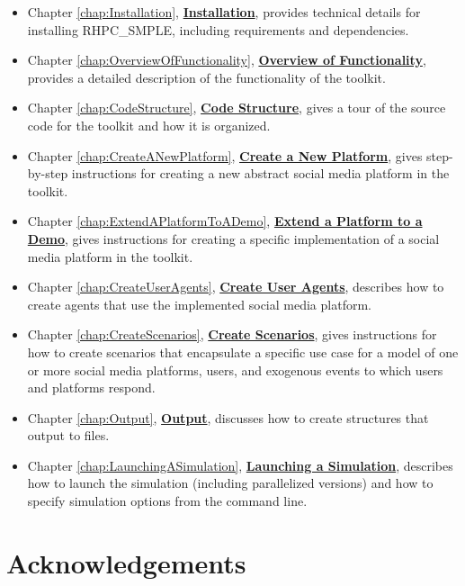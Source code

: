 \begin{itemize}
\item Chapter \ref*{chap:Installation}, \hyperref[chap:Installation]{\textbf{Installation}}, provides technical details for installing RHPC\_SMPLE, including requirements and dependencies.
\item Chapter \ref*{chap:OverviewOfFunctionality}, \hyperref[chap:OverviewOfFunctionality]{\textbf{Overview of Functionality}}, provides a detailed description of the functionality of the \rhpc toolkit.
\item Chapter \ref*{chap:CodeStructure}, \hyperref[chap:CodeStructure]{\textbf{Code Structure}}, gives a tour of the source code for the toolkit and how it is organized.
\item Chapter \ref*{chap:CreateANewPlatform}, \hyperref[chap:CreateANewPlatform]{\textbf{Create a New Platform}}, gives step-by-step instructions for creating a new abstract social media platform in the \rhpc toolkit.
\item Chapter \ref*{chap:ExtendAPlatformToADemo}, \hyperref[chap:ExtendAPlatformToADemo]{\textbf{Extend a Platform to a Demo}}, gives instructions for creating a specific implementation of a social media platform in the \rhpc toolkit.
\item Chapter \ref*{chap:CreateUserAgents}, \hyperref[chap:CreateUserAgents]{\textbf{Create User Agents}}, describes how to create agents that use the implemented social media platform. 
\item Chapter \ref*{chap:CreateScenarios}, \hyperref[chap:CreateScenarios]{\textbf{Create Scenarios}}, gives instructions for how to create scenarios that encapsulate a specific use case for a model of one or more social media platforms, users, and exogenous events to which users and platforms respond. 
\item Chapter \ref*{chap:Output}, \hyperref[chap:Output]{\textbf{Output}}, discusses how to create structures that output to files.
\item Chapter \ref*{chap:LaunchingASimulation}, \hyperref[chap:LaunchingASimulation]{\textbf{Launching a Simulation}}, describes how to launch the simulation (including parallelized versions) and how to specify simulation options from the command line.
\end{itemize}


\section{Acknowledgements}

